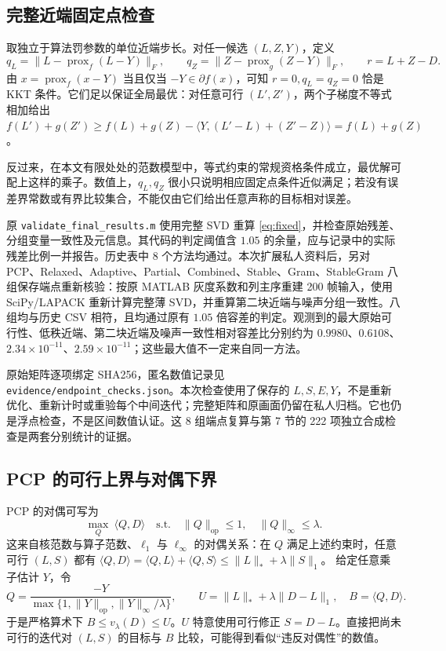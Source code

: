 \documentclass[UTF8,fontset=none,zihao=-4,a4paper]{ctexart}
\theoremstyle{plainzh}
\newcommand{\nuc}[1]{\lVert #1\rVert_*}
\newcommand{\op}[1]{\lVert #1\rVert_{\mathrm{op}}}
\newcommand{\fro}[1]{\lVert #1\rVert_F}
\newcommand{\ellone}[1]{\lVert #1\rVert_1}
\newcommand{\maxnorm}[1]{\lVert #1\rVert_\infty}
\newcommand{\ip}[2]{\langle #1,#2\rangle}
\newcommand{\prox}{\operatorname{prox}}
\numberwithin{equation}{section}
\begin{document}
\subsection{完整近端固定点检查}
取独立于算法罚参数的单位近端步长。对任一候选 $(L,Z,Y)$，定义
\begin{equation}\label{eq:fixed}
 q_L=\fro{L-\prox_f(L-Y)},\qquad
 q_Z=\fro{Z-\prox_g(Z-Y)},\qquad r=L+Z-D.
\end{equation}
由 $x=\prox_f(x-Y)$ 当且仅当 $-Y\in\partial f(x)$，可知 $r=0,q_L=q_Z=0$ 恰是 KKT 条件。它们足以保证全局最优：对任意可行 $(L',Z')$，两个子梯度不等式相加给出
$f(L')+g(Z')\geq f(L)+g(Z)-\ip Y{(L'-L)+(Z'-Z)}=f(L)+g(Z)$。

反过来，在本文有限处处的范数模型中，等式约束的常规资格条件成立，最优解可配上这样的乘子。数值上，$q_L,q_Z$ 很小只说明相应固定点条件近似满足；若没有误差界常数或有界比较集合，不能仅由它们给出任意声称的目标相对误差。

原 \texttt{validate\_final\_results.m} 使用完整 SVD 重算 \eqref{eq:fixed}，并检查原始残差、分组变量一致性及元信息。其代码的判定阈值含 $1.05$ 的余量，应与记录中的实际残差比例一并报告。历史表中 8 个方法均通过。本次扩展私人资料后，另对 PCP、Relaxed、Adaptive、Partial、Combined、Stable、Gram、StableGram 八组保存端点重新核验：按原 MATLAB 灰度系数和列主序重建 200 帧输入，使用 SciPy/LAPACK 重新计算完整薄 SVD，并重算第二块近端与噪声分组一致性。八组均与历史 CSV 相符，且均通过原有 $1.05$ 倍容差的判定。观测到的最大原始可行性、低秩近端、第二块近端及噪声一致性相对容差比分别约为 $0.9980$、$0.6108$、$2.34\times10^{-11}$、$2.59\times10^{-11}$；这些最大值不一定来自同一方法。\par
原始矩阵逐项绑定 SHA256，匿名数值记录见 \texttt{evidence/endpoint\_checks.json}。本次检查使用了保存的 $L,S,E,Y$，不是重新优化、重新计时或重验每个中间迭代；完整矩阵和原画面仍留在私人归档。它也仍是浮点检查，不是区间数值认证。这 8 组端点复算与第 7 节的 222 项独立合成检查是两套分别统计的证据。

\subsection{PCP 的可行上界与对偶下界}
PCP 的对偶可写为
\begin{equation}\label{eq:dual}
 \max_Q\ \ip QD\quad\text{s.t.}\quad \op Q\leq1,\quad\maxnorm Q\leq\lambda.
\end{equation}
这来自核范数与算子范数、$\ell_1$ 与 $\ell_\infty$ 的对偶关系：在 $Q$ 满足上述约束时，任意可行 $(L,S)$ 都有
$\ip QD=\ip QL+\ip QS\leq\nuc L+\lambda\ellone S$。
给定任意乘子估计 $Y$，令
\begin{equation}
 Q=\frac{-Y}{\max\{1,\op Y,\maxnorm Y/\lambda\}},\qquad
 U=\nuc L+\lambda\ellone{D-L},\quad B=\ip QD.
\end{equation}
于是严格算术下 $B\leq v_\lambda(D)\leq U$。$U$ 特意使用可行修正 $S=D-L$。直接把尚未可行的迭代对 $(L,S)$ 的目标与 $B$ 比较，可能得到看似“违反对偶性”的数值。
\end{document}

